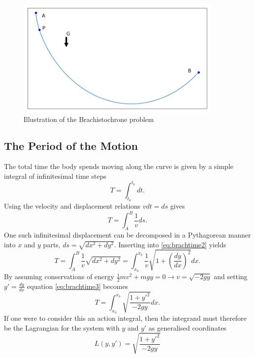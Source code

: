 \documentclass[11pt]{amsart}
\begin{document}
\begin{figure}
\centering
	\includegraphics[width=0.9\textwidth]{pearl_on_string.png}
	\caption{Illustration of the Brachistochrone problem}
	\label{fig:brach}
\end{figure}

\subsection{The Period of the Motion}
The total time the body spends moving along the curve is given by a simple integral of infinitesimal time steps
\begin{equation}
T = \int_{t_a}^{t_b}dt.
\end{equation}
Using the velocity and displacement relations $vdt = ds$ gives
\begin{equation}
\label{eq:brachtime2}
T = \int_{A}^{B}\frac{1}{v}ds.
\end{equation}
One such infinitesimal displacement can be decomposed in a Pythagorean manner into $x$ and $y$ parts, $ds = \sqrt{dx^2 + dy^2}$. Inserting into \ref{eq:brachtime2} yields
\begin{equation}
\label{eq:brachtime3}
T = \int_{A}^{B}\frac{1}{v}\sqrt{dx^2 + dy^2} = \int_{x_a}^{x_b}\frac{1}{v}\sqrt{1 + \left(\frac{dy}{dx} \right)^2}dx.
\end{equation}
By assuming conservations of energy $\frac{1}{2}mv^2 + mgy = 0 \to v = \sqrt{-2gy}$ and setting $y'=\frac{dy}{dx}$ equation \ref{eq:brachtime3} becomes
\begin{equation}
T = \int_{x_a}^{x_b} \sqrt{\frac{1+y'^2}{-2gy}}dx.
\end{equation}
If one were to consider this an action integral, then the integrand must therefore be the Lagrangian for the system with $y$ and $y'$ as generalised coordinates
\begin{equation}
L(y,y') = \sqrt{\frac{1+y'^2}{-2gy}}
\end{equation}
\end{document}
